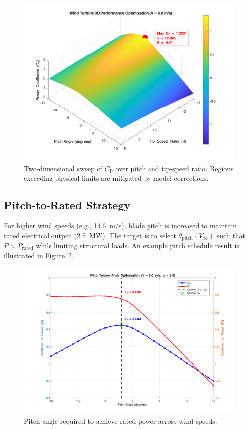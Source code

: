 \documentclass[11pt]{article}
\begin{document}
\begin{figure}[h]
  \centering
  \includegraphics[width=0.95\linewidth]{../../PNGS/2D_CP_Optimization_Results.png}
  \caption{Two-dimensional sweep of \(C_\mathrm{P}\) over pitch and tip-speed ratio. Regions exceeding physical limits are mitigated by model corrections.}
  \label{fig:cp_2d}
\end{figure}

\subsection{Pitch-to-Rated Strategy}
For higher wind speeds (e.g., \SI{14.6}{m/s}), blade pitch is increased to maintain rated electrical output (\SI{2.5}{MW}). The target is to select \(\theta_\mathrm{pitch}(V_\infty)\) such that \(P\approx P_\mathrm{rated}\) while limiting structural loads. An example pitch schedule result is illustrated in Figure~\ref{fig:pitch_to_rated}.

\begin{figure}[h]
  \centering
  \includegraphics[width=0.9\linewidth]{../../PNGS/Pitch_Optimization_Results.png}
  \caption{Pitch angle required to achieve rated power across wind speeds.}
  \label{fig:pitch_to_rated}
\end{figure}
\end{document}
